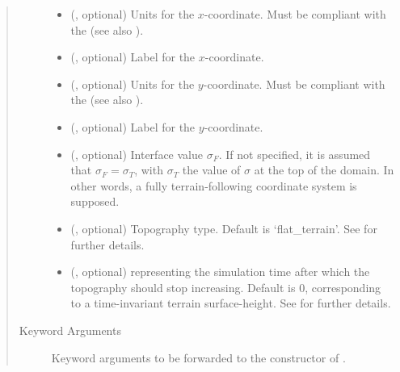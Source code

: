 \documentclass[letterpaper,10pt,english]{sphinxmanual}
\begin{document}
\begin{fulllineitems}
\begin{fulllineitems}
\begin{quote}
\begin{description}
\begin{itemize}
\item {} 
 (, optional) \textendash{} 
Units for the \(x\)-coordinate. Must be compliant with the 
(see also {\hyperref[\detokenize{api:tasmania.grids.axis.Axis.__init__}]{}}).


\item {} 
 (, optional) \textendash{} Label for the \(x\)-coordinate.

\item {} 
 (, optional) \textendash{} 
Units for the \(y\)-coordinate. Must be compliant with the 
(see also {\hyperref[\detokenize{api:tasmania.grids.axis.Axis.__init__}]{}}).


\item {} 
 (, optional) \textendash{} Label for the \(y\)-coordinate.

\item {} 
 (, optional) \textendash{} Interface value \(\sigma_F\). If not specified, it is assumed that \(\sigma_F = \sigma_T\),
with \(\sigma_T\) the value of  \(\sigma\) at the top of the domain. In other words, a fully
terrain-following coordinate system is supposed.

\item {} 
 (, optional) \textendash{} Topography type. Default is ‘flat\_terrain’. See {\hyperref[\detokenize{api:module-tasmania.grids.topography}]{}} for further details.

\item {} 
 (, optional) \textendash{}  representing the simulation time after which the topography should stop
increasing. Default is 0, corresponding to a time-invariant terrain surface-height.
See {\hyperref[\detokenize{api:module-tasmania.grids.topography}]{}} for further details.

\end{itemize}

\item[{Keyword Arguments}] \leavevmode
{} \textendash{} Keyword arguments to be forwarded to the constructor of {\hyperref[\detokenize{api:tasmania.grids.topography.Topography2d}]{}}.


\end{description}
\end{quote}
\end{fulllineitems}
\end{fulllineitems}
\end{document}
